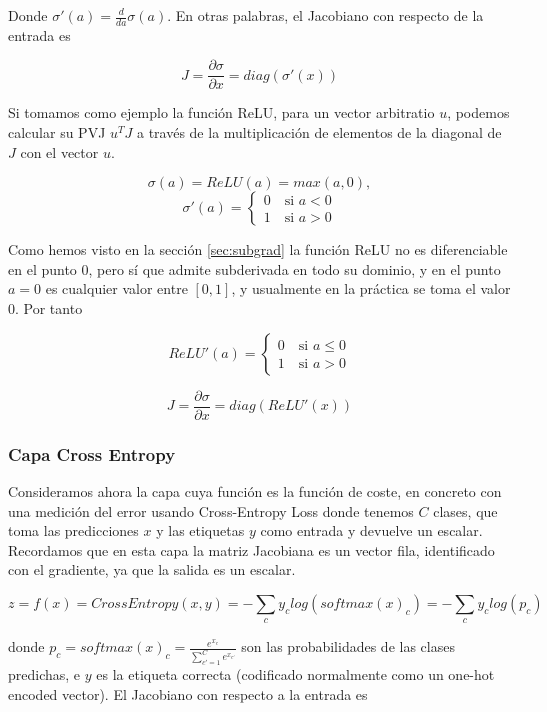 Donde $\sigma'(a) = \frac{d}{da}\sigma(a)$. En otras palabras, el Jacobiano con respecto de la entrada es 

$$J=\frac{\partial \sigma}{\partial x}= diag(\sigma'(x))$$

Si tomamos como ejemplo la función ReLU, para un vector arbitratio $u$, podemos calcular su PVJ $u^TJ$ a través de la multiplicación  de elementos de la diagonal de $J$ con el vector $u$. 


$$\sigma(a) = ReLU(a)= max(a,0),$$
$$\sigma'(a)=
\left\{\begin{matrix}

0 \quad \textrm{si } a<0  \\
1 \quad \textrm{si } a>0
\end{matrix}\right.
$$

Como hemos visto en la sección \ref{sec:subgrad} la función ReLU no es diferenciable en el punto 0, pero sí que admite subderivada en todo su dominio, y en el punto $a=0$ es cualquier valor entre $[0,1]$, y usualmente en la práctica se toma el valor 0. Por tanto

$$ReLU'(a)= \left\{\begin{matrix}

0 \quad \textrm{si } a\leq0  \\
1 \quad \textrm{si } a>0
\end{matrix}\right.$$

$$J=\frac{\partial \sigma}{\partial x}= diag(ReLU'(x))$$


\subsubsection{Capa Cross Entropy}

Consideramos ahora la capa cuya función es la función de coste, en concreto con una medición del error usando Cross-Entropy Loss donde tenemos $C$ clases, que toma las predicciones $x$ y las etiquetas $y$ como entrada y devuelve un escalar. Recordamos que en esta capa la matriz Jacobiana es un vector fila, identificado con el gradiente, ya que la salida es un escalar.

$$z=f(x)=CrossEntropy(x,y)= - \sum_c y_c log(softmax(x)_c) = - \sum_c y_c log(p_c)$$

donde $p_c=softmax(x)_c= \frac{e^{x_c}}{\sum_{c'=1}^C e^{x_{c'}}}$ son las probabilidades de las clases predichas, e $y$ es la etiqueta correcta (codificado normalmente como un one-hot encoded vector). El Jacobiano con respecto a la entrada es


